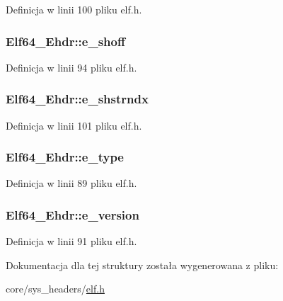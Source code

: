 Definicja w linii 100 pliku elf.\-h.

\hypertarget{struct_elf64___ehdr_a63fca3f9b273e5fd4d190d9cb7fba9b0}{
\subsubsection[{e\-\_\-shoff}]{ Elf64\-\_\-\-Ehdr\-::e\-\_\-shoff}}\label{struct_elf64___ehdr_a63fca3f9b273e5fd4d190d9cb7fba9b0}


Definicja w linii 94 pliku elf.\-h.

\hypertarget{struct_elf64___ehdr_ae8289d7705794be744876f6246242b9b}{
\subsubsection[{e\-\_\-shstrndx}]{ Elf64\-\_\-\-Ehdr\-::e\-\_\-shstrndx}}\label{struct_elf64___ehdr_ae8289d7705794be744876f6246242b9b}


Definicja w linii 101 pliku elf.\-h.

\hypertarget{struct_elf64___ehdr_a031210e6571dad798c4ed66b85631d58}{
\subsubsection[{e\-\_\-type}]{ Elf64\-\_\-\-Ehdr\-::e\-\_\-type}}\label{struct_elf64___ehdr_a031210e6571dad798c4ed66b85631d58}


Definicja w linii 89 pliku elf.\-h.

\hypertarget{struct_elf64___ehdr_a3855471cf08a9e4cd4b898e9a1e11fa4}{
\subsubsection[{e\-\_\-version}]{ Elf64\-\_\-\-Ehdr\-::e\-\_\-version}}\label{struct_elf64___ehdr_a3855471cf08a9e4cd4b898e9a1e11fa4}


Definicja w linii 91 pliku elf.\-h.



Dokumentacja dla tej struktury została wygenerowana z pliku\-:\begin{DoxyCompactItemize}
\item 
core/sys\-\_\-headers/\hyperlink{elf_8h}{elf.\-h}\end{DoxyCompactItemize}
